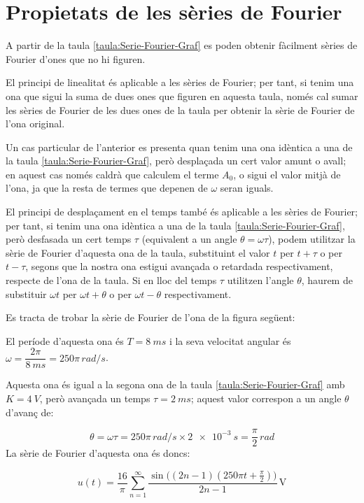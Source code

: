 \section{Propietats de les sèries de Fourier}

A partir de la taula \vref{taula:Serie-Fourier-Graf} es poden obtenir fàcilment sèries de Fourier d'ones que no hi figuren.

El principi de linealitat és aplicable a les sèries de Fourier; per tant, si tenim una ona que sigui la suma de dues ones que figuren en aquesta taula, només  cal sumar les sèries de Fourier de les dues ones de la taula per obtenir la sèrie de Fourier de l'ona original.

Un cas particular de l'anterior es presenta quan tenim una ona  idèntica a una de la taula \ref{taula:Serie-Fourier-Graf}, però desplaçada un cert valor amunt o avall; en aquest cas només caldrà que calculem el terme $A_0$, o sigui el valor mitjà de l'ona, ja que la resta de termes que depenen de $\omega$ seran iguals.

El principi de desplaçament en el temps també és aplicable a les sèries de Fourier; per tant, si tenim una ona idèntica a una de la taula \ref{taula:Serie-Fourier-Graf}, però desfasada un cert temps $\tau$ (equivalent a un angle $\theta = \omega \tau$), podem utilitzar la sèrie de Fourier d'aquesta ona de la taula, substituint el valor $t$ per $t+\tau$ o per $t-\tau$, segons que la nostra ona estigui avançada o retardada respectivament, respecte de l'ona de la taula. Si en lloc del temps $\tau$ utilitzen l'angle $\theta$, haurem de substituir  $\omega t$ per $\omega t + \theta$ o per $\omega t - \theta$ respectivament.


\begin{exemple}[\SerieFouTaulaFormes{}]
	\addcontentsxms{\SerieFouTaulaFormes}
    Es tracta de trobar la sèrie de Fourier de l'ona de la figura següent:
    \begin{center}
        
    \end{center}

    El període d'aquesta ona és $T=\qty{8}{ms}$ i la seva velocitat angular és $\omega = \dfrac{2\pi}{\qty{8}{ms}} = 250 \pi\unit{\,rad/s}$.

    Aquesta ona és igual a la segona ona de la taula \vref{taula:Serie-Fourier-Graf} amb $K=\qty{4}{V}$, però avançada un temps $\tau=\qty{2}{ms}$; aquest valor correspon a un angle $\theta$ d'avanç de:

    \[
        \theta = \omega \tau = 250\pi\unit{\,rad/s} \times \qty{2e-3}{s} = \frac{\pi}{2}\unit{\,rad}
    \]
    La sèrie de Fourier d'aquesta ona és doncs:

    \[
    u(t) = \frac{{16}}{\pi }\sum\limits_{n = 1}^\infty  {\frac{{\sin \big((2n - 1)(250\pi t+ \frac{\pi}{2})\big)}}{{2n - 1}}} \,\text{V}
    \]
\end{exemple}

